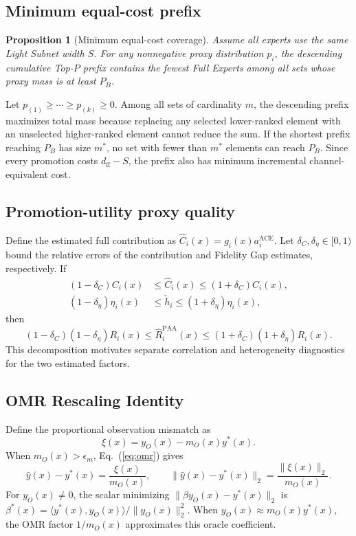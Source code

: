 \documentclass{article}
\newtheorem{proposition}{Proposition}
\begin{document}
\subsection{Minimum equal-cost prefix}

\begin{proposition}[Minimum equal-cost coverage]
Assume all experts use the same Light Subnet width $S$. For any nonnegative proxy distribution $p_i$, the descending cumulative Top-$P$ prefix contains the fewest Full Experts among all sets whose proxy mass is at least $P_B$.
\end{proposition}
Let $p_{(1)}\geq\cdots\geq p_{(k)}\geq0$. Among all sets of cardinality $m$, the descending prefix maximizes total mass because replacing any selected lower-ranked element with an unselected higher-ranked element cannot reduce the sum. If the shortest prefix reaching $P_B$ has size $m^*$, no set with fewer than $m^*$ elements can reach $P_B$. Since every promotion costs $d_{\mathrm{ff}}-S$, the prefix also has minimum incremental channel-equivalent cost.

\subsection{Promotion-utility proxy quality}

Define the estimated full contribution as $\widehat C_i(x)=g_i(x)a_i^{\mathrm{ACE}}$. Let $\delta_C,\delta_\eta\in[0,1)$ bound the relative errors of the contribution and Fidelity Gap estimates, respectively. If
\begin{align}
  (1-\delta_C)C_i(x)&\leq \widehat C_i(x)\leq(1+\delta_C)C_i(x),\nonumber\\
  (1-\delta_\eta)\eta_i(x)&\leq \widetilde h_i\leq(1+\delta_\eta)\eta_i(x),
\end{align}
then
\begin{equation}
  (1-\delta_C)(1-\delta_\eta)R_i(x)
  \leq \widehat R_i^{\mathrm{PAA}}(x)
  \leq (1+\delta_C)(1+\delta_\eta)R_i(x).
  \label{eq:proxy-product}
\end{equation}
This decomposition motivates separate correlation and heterogeneity diagnostics for the two estimated factors.

\subsection{OMR Rescaling Identity}

Define the proportional observation mismatch as
\begin{equation}
  \xi(x)=y_O(x)-m_O(x)y^*(x).
  \label{eq:mismatch}
\end{equation}
When $m_O(x)>\epsilon_m$, Eq.~(\ref{eq:omr}) gives
\begin{equation}
  \widehat y(x)-y^*(x)=\frac{\xi(x)}{m_O(x)},
  \qquad
  \lVert\widehat y(x)-y^*(x)\rVert_2
  =\frac{\lVert\xi(x)\rVert_2}{m_O(x)}.
  \label{eq:rescaling-error}
\end{equation}
For $y_O(x)\neq 0$, the scalar minimizing $\lVert\beta y_O(x)-y^*(x)\rVert_2$ is $\beta^*(x)=\langle y^*(x),y_O(x)\rangle/\lVert y_O(x)\rVert_2^2$. When $y_O(x)\approx m_O(x)y^*(x)$, the OMR factor $1/m_O(x)$ approximates this oracle coefficient.
\end{document}
